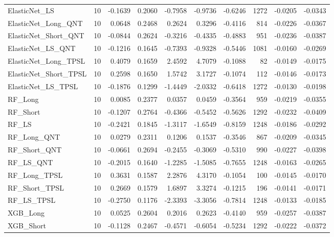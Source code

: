 \begin{tabular}{llrrrrrrrr}
\cline{1-10}
ElasticNet\_LS & 10 & -0.1639 & 0.2060 & -0.7958 & -0.9736 & -0.6246 & 1272 & -0.0205 & -0.0343 \\
\cline{1-10}
ElasticNet\_Long\_QNT & 10 & 0.0648 & 0.2468 & 0.2624 & 0.3296 & -0.4116 & 814 & -0.0226 & -0.0367 \\
\cline{1-10}
ElasticNet\_Short\_QNT & 10 & -0.0844 & 0.2624 & -0.3216 & -0.4335 & -0.4883 & 951 & -0.0236 & -0.0387 \\
\cline{1-10}
ElasticNet\_LS\_QNT & 10 & -0.1216 & 0.1645 & -0.7393 & -0.9328 & -0.5446 & 1081 & -0.0160 & -0.0269 \\
\cline{1-10}
ElasticNet\_Long\_TPSL & 10 & 0.4079 & 0.1659 & 2.4592 & 4.7079 & -0.1088 & 82 & -0.0149 & -0.0175 \\
\cline{1-10}
ElasticNet\_Short\_TPSL & 10 & 0.2598 & 0.1650 & 1.5742 & 3.1727 & -0.1074 & 112 & -0.0146 & -0.0173 \\
\cline{1-10}
ElasticNet\_LS\_TPSL & 10 & -0.1876 & 0.1299 & -1.4449 & -2.0332 & -0.6418 & 1272 & -0.0130 & -0.0198 \\
\cline{1-10}
RF\_Long & 10 & 0.0085 & 0.2377 & 0.0357 & 0.0459 & -0.3564 & 959 & -0.0219 & -0.0355 \\
\cline{1-10}
RF\_Short & 10 & -0.1207 & 0.2764 & -0.4366 & -0.5452 & -0.5626 & 1292 & -0.0232 & -0.0409 \\
\cline{1-10}
RF\_LS & 10 & -0.2421 & 0.1845 & -1.3117 & -1.6549 & -0.8159 & 1248 & -0.0186 & -0.0292 \\
\cline{1-10}
RF\_Long\_QNT & 10 & 0.0279 & 0.2311 & 0.1206 & 0.1537 & -0.3546 & 867 & -0.0209 & -0.0345 \\
\cline{1-10}
RF\_Short\_QNT & 10 & -0.0661 & 0.2694 & -0.2455 & -0.3069 & -0.5310 & 990 & -0.0227 & -0.0398 \\
\cline{1-10}
RF\_LS\_QNT & 10 & -0.2015 & 0.1640 & -1.2285 & -1.5085 & -0.7655 & 1248 & -0.0163 & -0.0265 \\
\cline{1-10}
RF\_Long\_TPSL & 10 & 0.3631 & 0.1587 & 2.2876 & 4.3170 & -0.1054 & 100 & -0.0145 & -0.0170 \\
\cline{1-10}
RF\_Short\_TPSL & 10 & 0.2669 & 0.1579 & 1.6897 & 3.3274 & -0.1215 & 196 & -0.0141 & -0.0171 \\
\cline{1-10}
RF\_LS\_TPSL & 10 & -0.2750 & 0.1176 & -2.3393 & -3.3056 & -0.7814 & 1248 & -0.0133 & -0.0185 \\
\cline{1-10}
XGB\_Long & 10 & 0.0525 & 0.2604 & 0.2016 & 0.2623 & -0.4140 & 959 & -0.0257 & -0.0387 \\
\cline{1-10}
XGB\_Short & 10 & -0.1128 & 0.2467 & -0.4571 & -0.6054 & -0.5234 & 1292 & -0.0222 & -0.0372 \\

\end{tabular}
